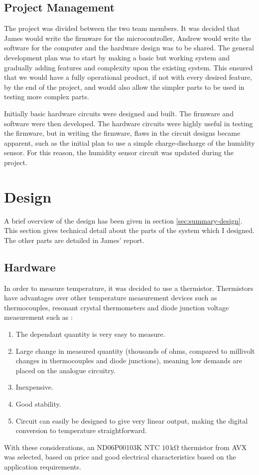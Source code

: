 \documentclass[a4paper,10pt]{article}  %
\begin{document}
\subsection{Project Management}
\label{sec:project-management}

The project was divided between the two team members. It was decided
that James would write the firmware for the microcontroller, Andrew
would write the software for the computer and the hardware design was
to be shared. The general development plan was to start by making a
basic but working system and gradually adding features and complexity
upon the existing system. This ensured that we would have a fully
operational product, if not with every desired feature, by the end of
the project, and would also allow the simpler parts to be used in
testing more complex parts.

Initially basic hardware circuits were designed and built. The firmware
and software were then developed. The hardware circuits were highly
useful in testing the firmware, but in writing the firmware, flaws in
the circuit designs became apparent, such as the initial plan to use a
simple charge-discharge of the humidity sensor. For this reason, the
humidity sensor circuit was updated during the project.

\section{Design}
\label{sec:design}

A brief overview of the design has been given in section
\ref{sec:summary-design}. This section gives technical detail about
the parts of the system which I designed. The other parts are detailed
in James' report.


\subsection{Hardware}
\label{sec:hardware}

In order to measure temperature, it was decided to use a
thermistor. Thermistors have advantages over other temperature
measurement devices such as thermocouples, resonant crystal
thermometers and diode junction voltage measurement such as \cite{HH}: 
\begin{enumerate}
  \item The dependant quantity is very easy to measure.
  \item Large change in measured quantity (thousands of ohms, compared
    to millivolt changes in thermocouples and diode junctions), meaning
    low demands are placed on the analogue circuitry.
  \item Inexpensive.
  \item Good stability.
  \item Circuit can easily be designed to give very linear output,
    making the digital conversion to temperature straightforward.
\end{enumerate}
With these considerations, an ND06P00103K NTC $10\,\mathrm{k\Omega}$ thermistor from AVX was
selected, based on price and good electrical characteristics based on
the application requirements.
\end{document}
